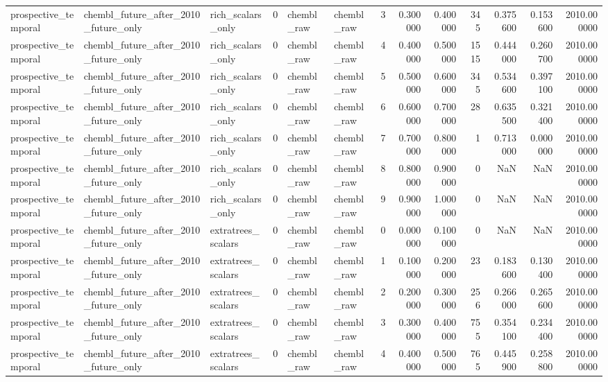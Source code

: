 \begin{longtable}{lllrllrrrrrrr}
prospective\_temporal & chembl\_future\_after\_2010\_future\_only & rich\_scalars\_only & 0 & chembl\_raw & chembl\_raw & 3 & 0.300000 & 0.400000 & 345 & 0.375600 & 0.153600 & 2010.000000 \\
prospective\_temporal & chembl\_future\_after\_2010\_future\_only & rich\_scalars\_only & 0 & chembl\_raw & chembl\_raw & 4 & 0.400000 & 0.500000 & 1515 & 0.444000 & 0.260700 & 2010.000000 \\
prospective\_temporal & chembl\_future\_after\_2010\_future\_only & rich\_scalars\_only & 0 & chembl\_raw & chembl\_raw & 5 & 0.500000 & 0.600000 & 345 & 0.534600 & 0.397100 & 2010.000000 \\
prospective\_temporal & chembl\_future\_after\_2010\_future\_only & rich\_scalars\_only & 0 & chembl\_raw & chembl\_raw & 6 & 0.600000 & 0.700000 & 28 & 0.635500 & 0.321400 & 2010.000000 \\
prospective\_temporal & chembl\_future\_after\_2010\_future\_only & rich\_scalars\_only & 0 & chembl\_raw & chembl\_raw & 7 & 0.700000 & 0.800000 & 1 & 0.713000 & 0.000000 & 2010.000000 \\
prospective\_temporal & chembl\_future\_after\_2010\_future\_only & rich\_scalars\_only & 0 & chembl\_raw & chembl\_raw & 8 & 0.800000 & 0.900000 & 0 & NaN & NaN & 2010.000000 \\
prospective\_temporal & chembl\_future\_after\_2010\_future\_only & rich\_scalars\_only & 0 & chembl\_raw & chembl\_raw & 9 & 0.900000 & 1.000000 & 0 & NaN & NaN & 2010.000000 \\
prospective\_temporal & chembl\_future\_after\_2010\_future\_only & extratrees\_scalars & 0 & chembl\_raw & chembl\_raw & 0 & 0.000000 & 0.100000 & 0 & NaN & NaN & 2010.000000 \\
prospective\_temporal & chembl\_future\_after\_2010\_future\_only & extratrees\_scalars & 0 & chembl\_raw & chembl\_raw & 1 & 0.100000 & 0.200000 & 23 & 0.183600 & 0.130400 & 2010.000000 \\
prospective\_temporal & chembl\_future\_after\_2010\_future\_only & extratrees\_scalars & 0 & chembl\_raw & chembl\_raw & 2 & 0.200000 & 0.300000 & 256 & 0.266000 & 0.265600 & 2010.000000 \\
prospective\_temporal & chembl\_future\_after\_2010\_future\_only & extratrees\_scalars & 0 & chembl\_raw & chembl\_raw & 3 & 0.300000 & 0.400000 & 755 & 0.354100 & 0.234400 & 2010.000000 \\
prospective\_temporal & chembl\_future\_after\_2010\_future\_only & extratrees\_scalars & 0 & chembl\_raw & chembl\_raw & 4 & 0.400000 & 0.500000 & 765 & 0.445900 & 0.258800 & 2010.000000 \\

\end{longtable}
